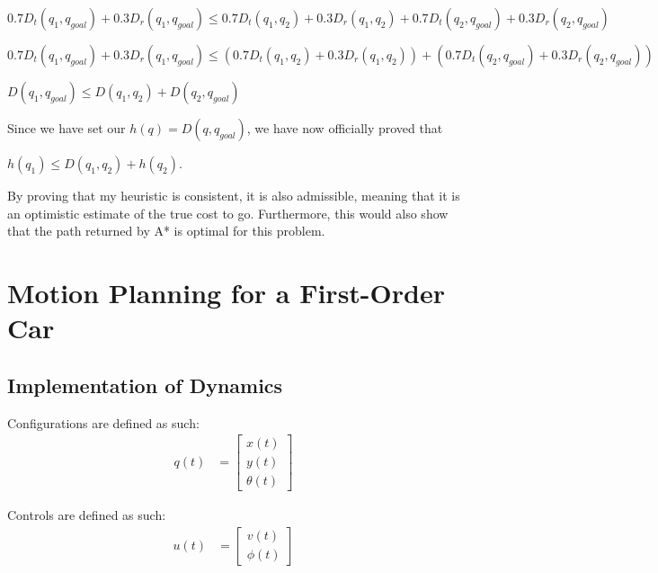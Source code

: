 \documentclass{article}
\begin{document}
$0.7 D_t(q_1, q_{goal}) + 0.3 D_r(q_1, q_{goal}) \leq 0.7D_t(q_1, q_2) + 0.3D_r(q_1, q_2) + 0.7D_t(q_2, q_{goal}) + 0.3D_r(q_2, q_{goal})$ \newline 

$0.7 D_t(q_1, q_{goal}) + 0.3 D_r(q_1, q_{goal}) \leq (0.7D_t(q_1, q_2) + 0.3D_r(q_1, q_2)) + (0.7D_t(q_2, q_{goal}) + 0.3D_r(q_2, q_{goal}))$ \newline 

$D(q_1, q_{goal}) \leq D(q_1, q_2) + D(q_2, q_{goal})$ \newline 

Since we have set our $h(q) = D(q, q_{goal})$, we have now officially proved that 

$h(q_1) \leq D(q_1, q_2) + h(q_2)$. \newline 

By proving that my heuristic is consistent, it is also admissible, meaning that it is an optimistic estimate of the true cost to go. Furthermore, this would also show that the path returned by A* is optimal for this problem. 

\newpage 
\maketitle
\section{Motion Planning for a First-Order Car}
\subsection{Implementation of Dynamics}
Configurations are defined as such: \newline 
\begin{align}
    q(t) &= \begin{bmatrix}
           x(t) \\
           y(t) \\
           \theta(t)
         \end{bmatrix}
\end{align}

Controls are defined as such: \newline 
\begin{align}
    u(t) &= \begin{bmatrix}
           v(t) \\
           \phi(t)
         \end{bmatrix}
\end{align}
\end{document}
